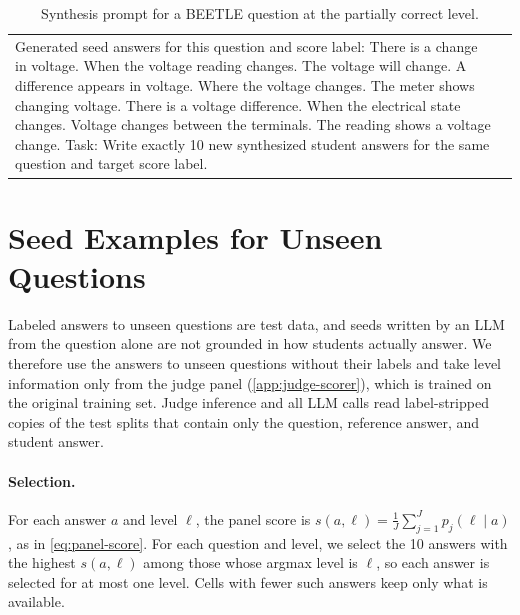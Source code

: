 \begin{table}[t]
\begin{tabular}{@{}p{}p{}@{}}
    Generated seed answers for this question and score label:\newline
    There is a change in voltage.\newline
    When the voltage reading changes.\newline
    The voltage will change.\newline
    A difference appears in voltage.\newline
    Where the voltage changes.\newline
    The meter shows changing voltage.\newline
    There is a voltage difference.\newline
    When the electrical state changes.\newline
    Voltage changes between the terminals.\newline
    The reading shows a voltage change.\newline\newline
    Task:\newline
    Write exactly 10 new synthesized student answers for the same question and target score label.
    \end{tabular}
    \caption{Synthesis prompt for a BEETLE question at the partially correct level.}
    \label{tab:synthesis-prompt}
\end{table}

\section{Seed Examples for Unseen Questions}
\label{app:seed-examples}

Labeled answers to unseen questions are test data, and seeds written by an LLM from the question alone are not grounded in how students actually answer. We therefore use the answers to unseen questions without their labels and take level information only from the judge panel (\autoref{app:judge-scorer}), which is trained on the original training set. Judge inference and all LLM calls read label-stripped copies of the test splits that contain only the question, reference answer, and student answer.

\paragraph{Selection.}
For each answer $a$ and level $\ell$, the panel score is $s(a, \ell) = \frac{1}{J} \sum_{j=1}^{J} p_j(\ell \mid a)$, as in \autoref{eq:panel-score}. For each question and level, we select the 10 answers with the highest $s(a, \ell)$ among those whose argmax level is $\ell$, so each answer is selected for at most one level. Cells with fewer such answers keep only what is available.

